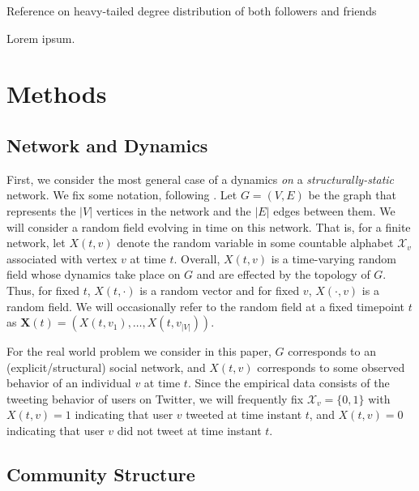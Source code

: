 \documentclass[12pt]{article}
\begin{document}
Reference on heavy-tailed degree distribution of both followers and friends~\cite{kwak2010twitter}


Lorem ipsum.

\section{Methods}

\subsection{Network and Dynamics}

First, we consider the most general case of a dynamics \emph{on} a \emph{structurally-static} network. We fix some notation, following \cite{kolaczyk2009statistical}. Let $G = (V, E)$ be the graph that represents the $|V|$ vertices in the network and the $|E|$ edges between them. We will consider a random field evolving in time on this network. That is, for a finite network, let $X(t, v)$ denote the random variable in some countable alphabet $\mathcal{X}_{v}$ associated with vertex $v$ at time $t$. Overall, $X(t, v)$ is a time-varying random field whose dynamics take place on $G$ and are effected by the topology of $G$. Thus, for fixed $t$, $X(t, \cdot)$ is a random vector and for fixed $v$, $X(\cdot, v)$ is a random field. We will occasionally refer to the random field at a fixed timepoint $t$ as $\mathbf{X}(t) = (X(t, v_{1}), \ldots, X(t, v_{|V|})).$

For the real world problem we consider in this paper, $G$ corresponds to an (explicit/structural) social network, and $X(t,v)$ corresponds to some observed behavior of an individual $v$ at time $t$. Since the empirical data consists of the tweeting behavior of users on Twitter, we will frequently fix $\mathcal{X}_{v} = \{0, 1\}$ with $X(t, v) = 1$ indicating that user $v$ tweeted at time instant $t$, and $X(t, v) = 0$ indicating that user $v$ did not tweet at time instant $t$.

\subsection{Community Structure}
\end{document}
